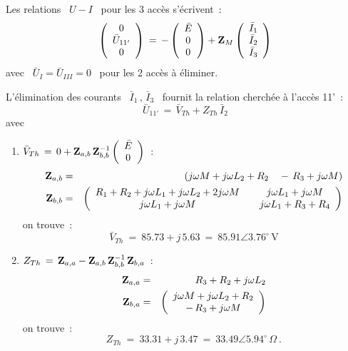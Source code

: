 Les relations \ $U-I$ \ pour les 3 accès s'écrivent~:
\[ \left( \begin{array}{c} 0 \\ \bar{U}_{11'} \\ 0 \end{array} \right) 
\: = \, - \left( \begin{array}{c} \bar{E} \\ 0 \\ 0 \end{array} \right) 
+ {\bf Z}_M \left( \begin{array}{c} \bar{I}_1 \\ \bar{I}_2 \\ \bar{I}_3 \end{array} \right)  \]
avec \ $\bar{U}_I = \bar{U}_{III} = 0$ \ pour les 2 accès à éliminer.

L'élimination des courants \ $\bar{I}_1\, , \, \bar{I}_3$ \ fournit la
relation cherchée à l'accès 11'~:
\[ \bar{U}_{11'} \, = \, \bar{V}_{Th} + Z_{Th} \, \bar{I}_2 \]
avec
\begin{enumerate}
	\item $\bar{V}_{Th} \, = \, 0 + {\bf Z}_{a,b} \, {\bf Z}_{b,b}^{-1} 
	\left( \begin{array}{c} \bar{E}\\ 0 \end{array} \right) $~:
	\begin{eqnarray*}
		{\bf Z}_{a,b} &=& \left( j\omega M + j\omega L_2 + R_2 ~~~-\, R_3 + j\omega M \right)\\
		{\bf Z}_{b,b} &=& \left( \begin{array}{ccc} 
			R_1 + R_2 + j\omega L_1 + j\omega L_2 + 2j\omega M && j\omega L_1 + j\omega M \\
			j\omega L_1 + j\omega M && j\omega L_1 + R_3 + R_4
		\end{array} \right)
	\end{eqnarray*}
	on trouve~: 
	\[ \bar{V}_{Th} \: = \: 85.73 + j\, 5.63 \: = \: 85.91 \angle 3.76^{\circ} \, \text{V} \]
	\item $Z_{Th} \, = \, {\bf Z}_{a,a} - {\bf Z}_{a,b} \, {\bf Z}_{b,b}^{-1} \, {\bf Z}_{b,a}$~:
	\begin{eqnarray*}
		{\bf Z}_{a,a} &=& R_3 + R_2 + j\omega L_2\\
		{\bf Z}_{b,a} &=& \left( \begin{array}{c}
			j\omega M + j\omega L_2 + R_2\\ -\, R_3 + j\omega M
		\end{array} \right) 
	\end{eqnarray*}
	on trouve~:
	\[ Z_{Th} \: = \: 33.31 + j\, 3.47 \: = \: 33.49 \angle 5.94^{\circ}\, \Omega~. \]
\end{enumerate}

